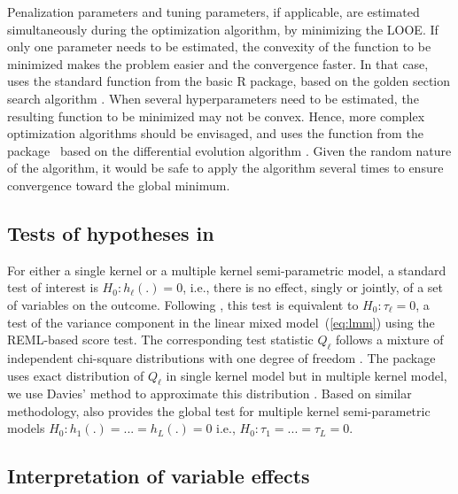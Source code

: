 Penalization parameters and tuning parameters, if applicable, are estimated simultaneously during the optimization algorithm, by minimizing the LOOE. If only one parameter needs to be estimated, the convexity of the function to be minimized makes the problem easier and the convergence faster. In that case,  uses the standard  function from the basic R package, based on the golden section search algorithm \citep{brent2013algorithms}. When several hyperparameters need to be estimated, the resulting function to be minimized may not be convex. Hence, more complex optimization algorithms should be envisaged, and  uses the  function from the  package~\citep{DEoptimPackage} based on the differential evolution algorithm \citep{mullen2009deoptim}. Given the random nature of the algorithm, it would be safe to apply the algorithm several times to ensure convergence toward the global minimum.



\subsection{Tests of hypotheses in }  \label{sec:models-tests}

For either a single kernel or a multiple kernel semi-parametric model, a standard test of interest is $H_0: h_{\ell}(.) = 0$, i.e., there is no effect, singly or jointly, of a set of variables on the outcome. Following \cite{liu2007semiparametric}, this test is equivalent to $H_0: \tau_{\ell} = 0$, a test of the variance component in the linear mixed model~(\ref{eq:lmm}) using the REML-based score test. The corresponding test statistic $Q_{\ell}$ follows a mixture of independent chi-square distributions with one degree of freedom \citep{zhang2003hypothesis}. 
The  package uses exact distribution of $Q_{\ell}$ in single kernel model but in multiple kernel model, we use Davies' method to approximate this distribution \citep{davies1980distribution}. Based on similar methodology,  also provides the global test for multiple kernel semi-parametric models $H_0: h_1(.) = ... = h_L(.) = 0$ i.e., $H_0: \tau_1 = ... = \tau_L = 0$.

\subsection{Interpretation of variable effects}  \label{sec:models-interpret}

